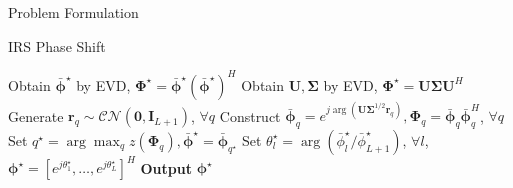 \documentclass[journal]{IEEEtran}
\begin{document}
\begin{section}{Problem Formulation}
\begin{subsection}{IRS Phase Shift}
\begin{algorithm}[!t]
\begin{algorithmic}[1]
						\State Obtain $\bar{\boldsymbol{\phi}}^\star$ by EVD, $\boldsymbol{\Phi}^{\star}=\bar{\boldsymbol{\phi}}^\star(\bar{\boldsymbol{\phi}}^\star)^H$
					\Else
						\State Obtain $\boldsymbol{U},\boldsymbol{\Sigma}$ by EVD, $\boldsymbol{\Phi}^{\star}=\boldsymbol{U}\boldsymbol{\Sigma}\boldsymbol{U}^H$
						\State Generate $\boldsymbol{r}_q \sim \mathcal{CN}(\boldsymbol{0},\boldsymbol{I}_{L+1})$, $\forall q$
						\State Construct $\bar{\boldsymbol{\phi}}_q=e^{j\arg\left(\boldsymbol{U}\boldsymbol{\Sigma}^{1/2}\boldsymbol{r}_q\right)},\boldsymbol{\Phi}_q=\bar{\boldsymbol{\phi}}_q\bar{\boldsymbol{\phi}}_q^H$, $\forall q$
						\State Set $q^{\star}=\arg\max_q{z(\boldsymbol{\Phi}_q)},\bar{\boldsymbol{\phi}}^\star=\bar{\boldsymbol{\phi}}_{q^{\star}}$
					\EndIf
					\State Set $\theta_l^\star=\arg(\bar{\phi}_l^\star/\bar{\phi}_{L+1}^\star)$, $\forall l$, $\boldsymbol{\phi}^{\star}=[e^{j\theta_1^\star},\dots,e^{j\theta_L^\star}]^H$
					\State \textbf{Output} $\boldsymbol{\phi}^{\star}$
				\end{algorithmic}
			\end{algorithm}
		\end{subsection}



\end{section}
\end{document}
